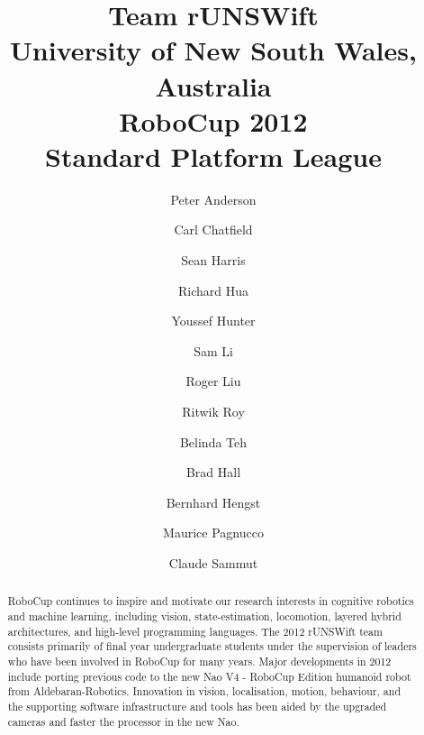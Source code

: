 \documentclass[runningheads,a4paper]{llncs}
\begin{document}
\mainmatter 

\title{
Team rUNSWift\\
University of New South Wales, Australia\\
\vspace{1cm}
RoboCup 2012\\
Standard Platform League}

\author{
Peter Anderson
\and Carl Chatfield
\and Sean Harris
\and Richard Hua
\and Youssef Hunter
\and Sam Li
\and Roger Liu
\and Ritwik Roy
\and Belinda Teh
\and Brad Hall
\and Bernhard Hengst
\and Maurice Pagnucco 
\and Claude Sammut
\mailsa\\
}


\maketitle

\begin{abstract}
RoboCup continues to inspire and motivate our research interests in cognitive robotics and machine learning, including vision, state-estimation, locomotion, layered hybrid architectures, and high-level programming languages. The 2012 rUNSWift team consists primarily of final year undergraduate students under the supervision of  leaders who have been involved in RoboCup for many years. Major developments in 2012 include porting previous code to the new Nao V4 - RoboCup Edition humanoid robot from Aldebaran-Robotics. Innovation in vision, localisation, motion, behaviour, and the supporting software infrastructure and tools has been aided by the upgraded cameras and faster the processor in the new Nao.   
\end{abstract}

\end{document}
